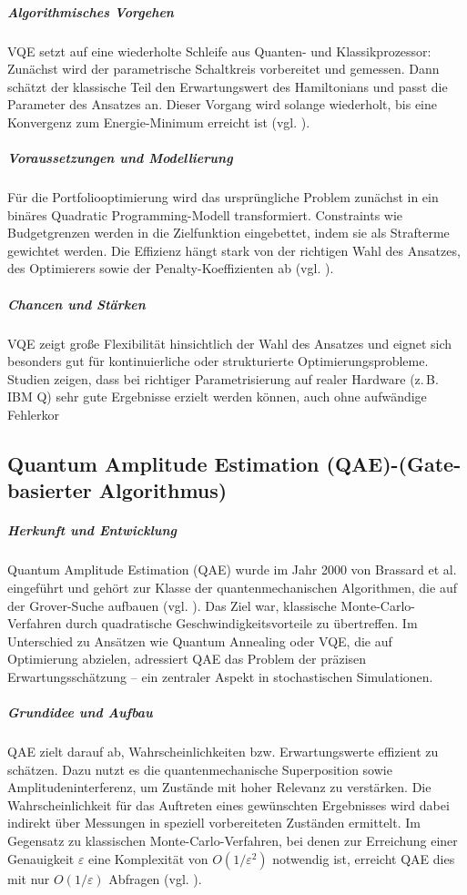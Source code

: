 \subparagraph{Algorithmisches Vorgehen}
VQE setzt auf eine wiederholte Schleife aus Quanten- und Klassikprozessor: Zunächst wird der parametrische Schaltkreis vorbereitet und gemessen. Dann schätzt der klassische Teil den Erwartungswert des Hamiltonians und passt die Parameter des Ansatzes an. Dieser Vorgang wird solange wiederholt, bis eine Konvergenz zum Energie-Minimum erreicht ist (vgl. \cite{buonaiuto_best_2023}).

\subparagraph{Voraussetzungen und Modellierung}
Für die Portfoliooptimierung wird das ursprüngliche Problem zunächst in ein binäres Quadratic Programming-Modell transformiert. Constraints wie Budgetgrenzen werden in die Zielfunktion eingebettet, indem sie als Strafterme gewichtet werden. Die Effizienz hängt stark von der richtigen Wahl des Ansatzes, des Optimierers sowie der Penalty-Koeffizienten ab (vgl. \cite{buonaiuto_best_2023}).

\subparagraph{Chancen und Stärken}
VQE zeigt große Flexibilität hinsichtlich der Wahl des Ansatzes und eignet sich besonders gut für kontinuierliche oder strukturierte Optimierungsprobleme. Studien zeigen, dass bei richtiger Parametrisierung auf realer Hardware (z.\,B. IBM Q) sehr gute Ergebnisse erzielt werden können, auch ohne aufwändige Fehlerkor


\subsection{Quantum Amplitude Estimation (QAE)-(Gate-basierter Algorithmus)} 

\subparagraph{Herkunft und Entwicklung}
Quantum Amplitude Estimation (QAE) wurde im Jahr 2000 von Brassard et al. eingeführt und gehört zur Klasse der quantenmechanischen Algorithmen, die auf der Grover-Suche aufbauen (vgl. \cite{stamatopoulos_option_2020}). Das Ziel war, klassische Monte-Carlo-Verfahren durch quadratische Geschwindigkeitsvorteile zu übertreffen. Im Unterschied zu Ansätzen wie Quantum Annealing oder VQE, die auf Optimierung abzielen, adressiert QAE das Problem der präzisen Erwartungsschätzung – ein zentraler Aspekt in stochastischen Simulationen.

\subparagraph{Grundidee und Aufbau}
QAE zielt darauf ab, Wahrscheinlichkeiten bzw. Erwartungswerte effizient zu schätzen. Dazu nutzt es die quantenmechanische Superposition sowie Amplitudeninterferenz, um Zustände mit hoher Relevanz zu verstärken. Die Wahrscheinlichkeit für das Auftreten eines gewünschten Ergebnisses wird dabei indirekt über Messungen in speziell vorbereiteten Zuständen ermittelt. Im Gegensatz zu klassischen Monte-Carlo-Verfahren, bei denen zur Erreichung einer Genauigkeit $\varepsilon$ eine Komplexität von $O(1/\varepsilon^2)$ notwendig ist, erreicht QAE dies mit nur $O(1/\varepsilon)$ Abfragen (vgl. \cite{stamatopoulos_option_2020, rebentrost_quantum_2018}).

